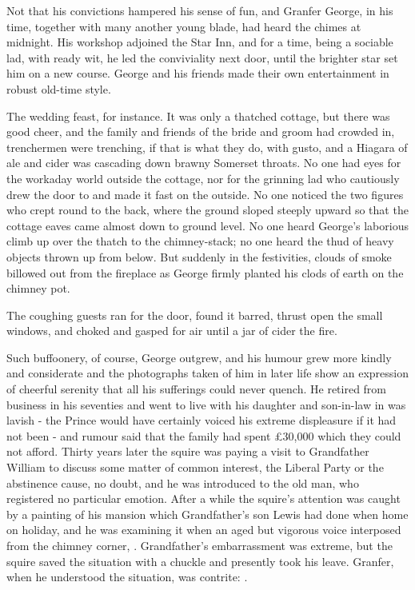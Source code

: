 Not that his convictions hampered his sense of fun, and Granfer George, in his time, together with many another young blade, had heard the chimes at midnight. His workshop adjoined the Star Inn, and for a time, being a sociable lad, with ready wit, he led the conviviality next door, until the brighter star set him on a new course. George and his friends made their own entertainment in robust old-time style.

The wedding feast, for instance. It was only a thatched cottage, but there was good cheer, and the family and friends of the bride and groom had crowded in, trenchermen were trenching, if that is what they do, with gusto, and a Hiagara of ale and cider was cascading down brawny Somerset throats. No one had eyes for the workaday world outside the cottage, nor for the grinning lad who cautiously drew the door to and made it fast on the outside. No one noticed the two figures who crept round to the back, where the ground sloped steeply upward so that the cottage eaves came almost down to ground level. No one heard George's laborious climb up over the thatch to the chimney-stack; no one heard the thud of heavy objects thrown up from below. But suddenly in the festivities, clouds of smoke billowed out from the fireplace as George firmly planted his clods of earth on the chimney pot.

The coughing guests ran for the door, found it barred, thrust open the small windows, and choked and gasped for air until a jar of cider  the fire.

Such buffoonery, of course, George outgrew, and his humour grew more kindly and considerate and the photographs taken of him in later life show an expression of cheerful serenity that all his sufferings could never quench. He retired from business in his seventies and went to live with his daughter and son-in-law in was lavish - the Prince would have certainly voiced his extreme displeasure if it had not been - and rumour said that the family had spent £30,000 which they could not afford. Thirty years later the squire was paying a visit to Grandfather William to discuss some matter of common interest, the Liberal Party or the abstinence cause, no doubt, and he was introduced to the old man, who registered no particular emotion. After a while the squire's attention was caught by a painting of his mansion which Grandfather's son Lewis had done when home on holiday, and he was examining it when an aged but vigorous voice interposed from the chimney corner, . Grandfather's embarrassment was extreme, but the squire saved the situation with a chuckle and presently took his leave. Granfer, when he understood the situation, was contrite: .
 
